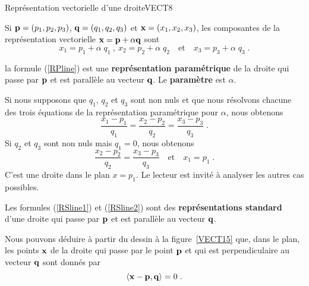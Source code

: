 {
{Représentation vectorielle d'une droite}{VECT8}

Si $\mathbf{p}=(p_1,p_2,p_3)$, $\mathbf{q} = (q_1, q_2, q_3)$ et
$\mathbf{x}=(x_1,x_2,x_3)$,  les composantes de la représentation vectorielle
$\mathbf{x} = \mathbf{p} + \alpha \mathbf{q}$ sont
\begin{equation}\label{RPline}
x_1 = p_1 + \alpha\; q_1 \ , \ x_2 = p_2 + \alpha\; q_2 \quad \text{et}
\quad x_3 = p_3 + \alpha\; q_3 \; .
\end{equation}

\begin{defn} 
la formule (\ref{RPline}) est une {\bfseries représentation
paramétrique} de la droite qui passe par $\mathbf{p}$ et est parallèle au
vecteur $\mathbf{q}$.  Le {\bfseries paramètre} est $\alpha$.
\end{defn}

Si nous supposons que $q_1$, $q_2$ et $q_3$ sont non nuls et que nous
résolvons chacune des trois équations de la représentation paramétrique
pour $\alpha$, nous obtenons 
\begin{equation}\label{RSline1}
\frac{x_1-p_1}{q_1} = \frac{x_2-p_2}{q_2} = \frac{x_3-p_3}{q_3} \; .
\end{equation}
Si $q_2$ et $q_3$ sont non nuls mais $q_1 = 0$, nous obtenons
\begin{equation}\label{RSline2}
\frac{x_2-p_2}{q_2} = \frac{x_3-p_3}{q_3} \quad \text{et} \quad x_1 = p_1 \; .
\end{equation}
C'est une droite dans le plan $x=p_1$.  Le lecteur est invité à
analyser les autres cas possibles.

\begin{defn} 
Les formules (\ref{RSline1}) et (\ref{RSline2}) sont des
{\bfseries représentations standard}
d'une droite qui passe par $\mathbf{p}$ et est parallèle au vecteur
$\mathbf{q}$.
\end{defn}

\begin{rmk}
Nous pouvons déduire à partir du dessin à la figure~\ref{VECT15} que,
dans le plan, les points $\mathbf{x}$ de la droite qui passe par le point
$\mathbf{p}$ et qui est perpendiculaire au vecteur $\mathbf{q}$ sont donnés par
\[
\left\langle{\mathbf{x} - \mathbf{p}} , {\mathbf{q}}\right\rangle = 0 \; .
\]
\end{rmk}


}
